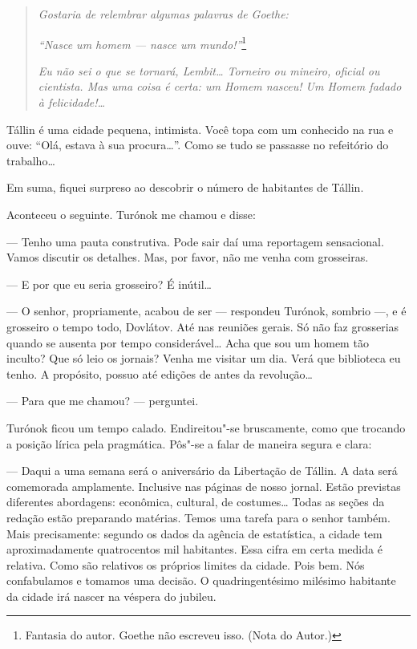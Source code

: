 \begin{quotation}
\emph{Gostaria de relembrar algumas palavras de Goethe:}

\emph{``Nasce um homem --- nasce um mundo!''}\footnote{Fantasia do
  autor. Goethe não escreveu isso. (Nota do Autor.)}

\emph{Eu não sei o que se tornará, Lembit\ldots{} Torneiro ou mineiro,
oficial ou cientista. Mas uma coisa é certa: um Homem nasceu! Um Homem
fadado à felicidade!\ldots{}}
\end{quotation}

Tállin é uma cidade pequena, intimista. Você topa com um conhecido na
rua e ouve: ``Olá, estava à sua procura\ldots{}''. Como se tudo se passasse
no refeitório do trabalho\ldots{}

Em suma, fiquei surpreso ao descobrir o número de habitantes de Tállin.

Aconteceu o seguinte. Turónok me chamou e disse:

--- Tenho uma pauta construtiva. Pode sair daí uma reportagem
sensacional. Vamos discutir os detalhes. Mas, por favor, não me venha
com grosseiras.

--- E por que eu seria grosseiro? É inútil\ldots{}

--- O senhor, propriamente, acabou de ser --- respondeu Turónok, sombrio
---, e é grosseiro o tempo todo, Dovlátov. Até nas reuniões gerais. Só
não faz grosserias quando se ausenta por tempo considerável\ldots{} Acha que
sou um homem tão inculto? Que só leio os jornais? Venha me visitar um
dia. Verá que biblioteca eu tenho. A propósito, possuo até edições de
antes da revolução\ldots{}

--- Para que me chamou? --- perguntei.

Turónok ficou um tempo calado. Endireitou"-se bruscamente, como que
trocando a posição lírica pela pragmática. Pôs"-se a falar de maneira
segura e clara:

--- Daqui a uma semana será o aniversário da Libertação de Tállin. A
data será comemorada amplamente. Inclusive nas páginas de nosso jornal.
Estão previstas diferentes abordagens: econômica, cultural, de
costumes\ldots{} Todas as seções da redação estão preparando matérias. Temos
uma tarefa para o senhor também. Mais precisamente: segundo os dados da
agência de estatística, a cidade tem aproximadamente quatrocentos mil
habitantes. Essa cifra em certa medida é relativa. Como são relativos os
próprios limites da cidade. Pois bem. Nós confabulamos e tomamos uma
decisão. O quadringentésimo milésimo habitante da cidade irá nascer na
véspera do jubileu.

